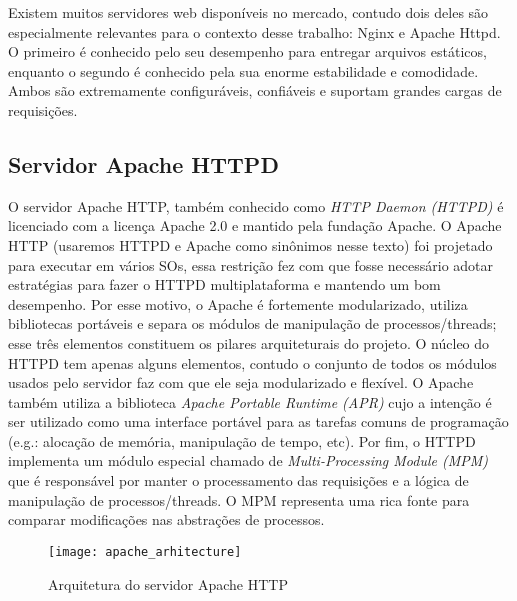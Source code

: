 Existem muitos servidores web disponíveis no mercado, contudo dois deles são
especialmente relevantes para o contexto desse trabalho: Nginx e Apache Httpd.
O primeiro é conhecido pelo seu desempenho para entregar arquivos estáticos,
enquanto o segundo é conhecido pela sua enorme estabilidade e comodidade. Ambos
são extremamente configuráveis, confiáveis e suportam grandes cargas de
requisições.

\subsection{Servidor Apache HTTPD}
\label{sec:architecture}

O servidor Apache HTTP, também conhecido como \textit{HTTP Daemon (HTTPD)} é
licenciado com a licença Apache 2.0 e mantido pela fundação Apache.  O Apache
HTTP (usaremos HTTPD e Apache como sinônimos nesse texto) foi projetado para
executar em vários SOs, essa restrição fez com que fosse necessário adotar
estratégias para fazer o HTTPD multiplataforma e mantendo um bom desempenho.
Por esse motivo, o Apache é fortemente modularizado, utiliza bibliotecas
portáveis e separa os módulos de manipulação de processos/threads; esse três
elementos constituem os pilares arquiteturais do projeto. O núcleo do HTTPD tem
apenas alguns elementos, contudo o conjunto de todos os módulos usados pelo
servidor faz com que ele seja modularizado e flexível. O Apache também utiliza
a biblioteca \textit{Apache Portable Runtime (APR)} cujo a intenção é ser
utilizado como uma interface portável para as tarefas comuns de programação
(e.g.: alocação de memória, manipulação de tempo, etc). Por fim, o HTTPD
implementa um módulo especial chamado de \textit{Multi-Processing Module (MPM)}
que é responsável por manter o processamento das requisições e a lógica de
manipulação de processos/threads. O MPM representa uma rica fonte para comparar
modificações nas abstrações de processos.

\begin{figure}[!h]
  \centering
  \texttt{[image: apache\_arhitecture]} 
  \caption{Arquitetura do servidor Apache HTTP \citep{apache_module_book}}
  \label{fig:apache_architecture} 
\end{figure}

